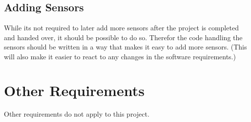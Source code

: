 \documentclass[a4paper]{scrreprt}
\begin{document}
\subsection{Adding Sensors}
While its not required to later add more sensors after the project 
is completed and handed over, it should be possible to do so.
Therefor the code handling the sensors should be written in a way 
that makes it easy to add more sensors. 
(This will also make it easier to react to any changes in the software requirements.)

\section{Other Requirements}
Other requirements do not apply to this project.
\end{document}
